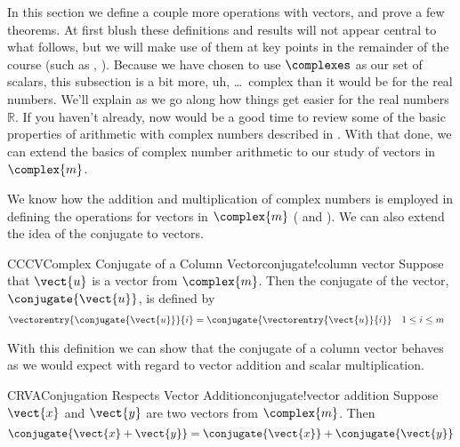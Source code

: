 %
In this section we define a couple more operations with vectors, and prove a few theorems.  At first blush these definitions and results will not appear central to what follows, but we will make use of them at key points in the remainder of the course (such as , ).  Because we have chosen to use $\complexes$ as our set of scalars, this subsection is a bit more, uh, \dots\ complex than it would be for the real numbers.  We'll explain as we go along how things get easier for the real numbers ${\mathbb R}$.  If you haven't already, now would be a good time to review some of the basic properties of arithmetic with complex numbers described in .  With that done, we can extend the basics of complex number arithmetic to our study of vectors in $\complex{m}$.\par
%
%
We know how the addition and multiplication of complex numbers is employed in defining the operations for vectors in $\complex{m}$ ( and ).  We can also extend the idea of the conjugate to vectors.
%
\begin{definition}{CCCV}{Complex Conjugate of a Column Vector}{conjugate!column vector}
Suppose that $\vect{u}$ is a vector from $\complex{m}$.  Then the conjugate of the vector, $\conjugate{\vect{u}}$, is defined by
%
\begin{align*}
\vectorentry{\conjugate{\vect{u}}}{i}
&=\conjugate{\vectorentry{\vect{u}}{i}}
&&\text{$1\leq i\leq m$}
\end{align*}
%
\end{definition}
%
With this definition we can show that the conjugate of a column vector behaves as we would expect with regard to vector addition and scalar multiplication.
%
\begin{theorem}{CRVA}{Conjugation Respects Vector Addition}{conjugate!vector addition}
Suppose $\vect{x}$ and $\vect{y}$ are two vectors from $\complex{m}$.  Then
%
\begin{equation*}
\conjugate{\vect{x}+\vect{y}}=\conjugate{\vect{x}}+\conjugate{\vect{y}}
\end{equation*}
%
\end{theorem}
